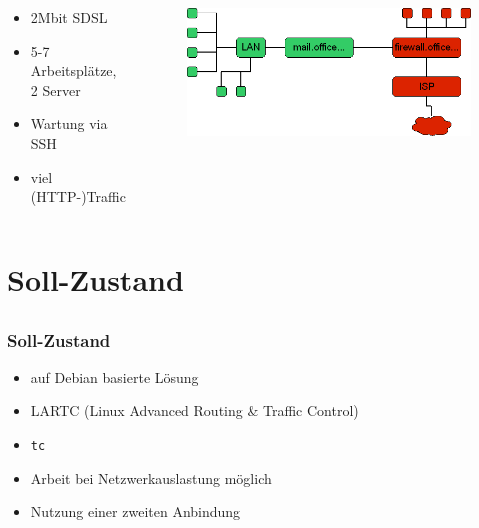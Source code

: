 \documentclass[14pt]{beamer}
\begin{document}
\begin{frame}
\begin{columns}[c]
  \column{1.8in}

\begin{footnotesize}  \begin{itemize}
    \item 2Mbit SDSL
    \item 5-7 Arbeitsplätze, 2 Server
    \item Wartung via SSH
    \item viel (HTTP-)Traffic
  \end{itemize}\end{footnotesize}

  \column{1.8in}
\begin{figure}[h!]
      \includegraphics[width=1\textwidth]{GFX/netzplan_neu}
  \end{figure}
\end{columns}
\end{frame}

\section{Soll-Zustand}
\subsection*{}
\begin{frame}
\frametitle{Soll-Zustand}
\begin{itemize}
 \item auf Debian basierte Lösung
\item LARTC (Linux Advanced Routing \& Traffic Control)
\item \texttt{tc}\\
\item Arbeit bei Netzwerkauslastung möglich
\item Nutzung einer zweiten Anbindung
\end{itemize}
\end{frame}
\end{document}
